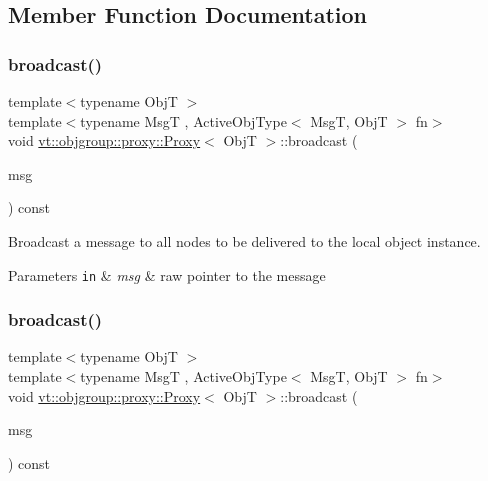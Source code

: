 \subsection{Member Function Documentation}
\mbox{\label{structvt_1_1objgroup_1_1proxy_1_1_proxy_a0b716ca776b1f06e0d7d45afbe9e5274}} 
\subsubsection{\texorpdfstring{broadcast()}{broadcast()}\hspace{0.1cm}{\footnotesize\ttfamily [1/3]}}
{\footnotesize\ttfamily template$<$typename ObjT $>$ \\
template$<$typename MsgT , Active\+Obj\+Type$<$ Msg\+T, Obj\+T $>$ fn$>$ \\
void \hyperlink{structvt_1_1objgroup_1_1proxy_1_1_proxy}{vt\+::objgroup\+::proxy\+::\+Proxy}$<$ ObjT $>$\+::broadcast (\begin{DoxyParamCaption}\item[{MsgT $\ast$}]{msg }\end{DoxyParamCaption}) const}



Broadcast a message to all nodes to be delivered to the local object instance. 


\begin{DoxyParams}[1]{Parameters}
\mbox{\tt in}  & {\em msg} & raw pointer to the message \\
\hline
\end{DoxyParams}
\mbox{\label{structvt_1_1objgroup_1_1proxy_1_1_proxy_a7616a82936034b59e1b05c6b033236a2}} 
\subsubsection{\texorpdfstring{broadcast()}{broadcast()}\hspace{0.1cm}{\footnotesize\ttfamily [2/3]}}
{\footnotesize\ttfamily template$<$typename ObjT $>$ \\
template$<$typename MsgT , Active\+Obj\+Type$<$ Msg\+T, Obj\+T $>$ fn$>$ \\
void \hyperlink{structvt_1_1objgroup_1_1proxy_1_1_proxy}{vt\+::objgroup\+::proxy\+::\+Proxy}$<$ ObjT $>$\+::broadcast (\begin{DoxyParamCaption}\item[{\hyperlink{namespacevt_a9f5ebd62ee9d6dd8829e3e1cc4f858e9}{Msg\+Ptr}$<$ MsgT $>$}]{msg }\end{DoxyParamCaption}) const}



